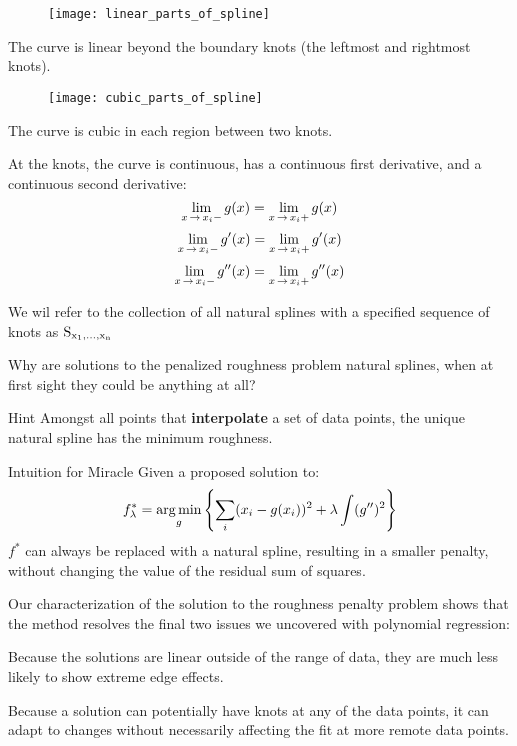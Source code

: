 %
%
\begin{frame}
  \begin{figure}
    \texttt{[image: linear\_parts\_of\_spline]}
  \end{figure}
  The curve is linear beyond the boundary knots (the leftmost and rightmost knots).
\end{frame}
%
%
\begin{frame}
  \begin{figure}
    \texttt{[image: cubic\_parts\_of\_spline]}
  \end{figure}
  The curve is cubic in each region between two knots.
\end{frame}
%
%
\begin{frame}
  At the knots, the curve is continuous, has a continuous first derivative, and a continuous second derivative:
  $$ \lim_{x \operatorname*{\rightarrow} x_i -} g(x) =\lim_{x \operatorname*{\rightarrow} x_i +} g(x) $$
  $$ \lim_{x \operatorname*{\rightarrow} x_i -} g'(x) =\lim_{x \operatorname*{\rightarrow} x_i +} g'(x) $$
  $$ \lim_{x \operatorname*{\rightarrow} x_i -} g''(x) =\lim_{x \operatorname*{\rightarrow} x_i +} g''(x) $$
\end{frame}
%
%
\begin{frame}
  We wil refer to the collection of all natural splines with a specified sequence of knots as ${\operatorname*{S_{x_1, \ldots, x_n}}}$
\end{frame}
%
%
\begin{frame}
  Why are solutions to the penalized roughness problem natural splines, when at first sight they could be anything at all?
\end{frame}
%
%
\begin{frame}
  \begin{block}{Hint}
    Amongst all points that \textbf{interpolate} a set of data points, the unique natural spline has the minimum roughness.
  \end{block}
\end{frame}
%
%
\begin{frame}
  \begin{block}{Intuition for Miracle}
    Given a proposed solution to:
    $$ f_{\lambda}^* = \operatorname*{arg\,min}_{g} \left\{ \sum_i (x_i - g(x_i))^2 + \lambda \int (g'')^2 \right\} $$
    $f^*$ can always be replaced with a natural spline, resulting in a smaller penalty, without changing the value of the residual sum of squares.
  \end{block}
\end{frame}
%
%
\begin{frame}
  Our characterization of the solution to the roughness penalty problem shows that the method resolves the final two issues we uncovered with polynomial regression:
\end{frame}
%
%
\begin{frame}
  Because the solutions are linear outside of the range of data, they are much less likely to show extreme edge effects.
\end{frame}
%
%
\begin{frame}
  Because a solution can potentially have knots at any of the data points, it can adapt to changes without necessarily affecting the fit at more remote data points.
\end{frame}

